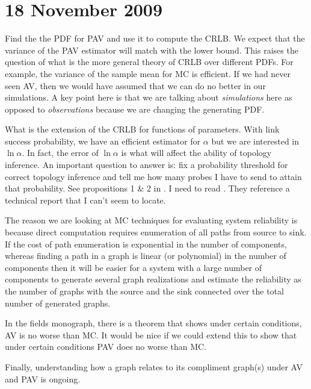 \section{18 November 2009}
Find the the \ac{PDF} for \ac{PAV} and use it to compute the \ac{CRLB}. We expect that the variance of the \ac{PAV} estimator will match with the lower bound. This raises the question of what is the more general theory of \ac{CRLB} over different \ac{PDF}s. For example, the variance of the sample mean for \ac{MC} is efficient. If we had never seen \ac{AV}, then we would have assumed that we can do no better in our simulations. A key point here is that we are talking about \emph{simulations} here as opposed to \emph{observations} because we are changing the generating \ac{PDF}.

What is the extension of the \ac{CRLB} for functions of parameters. With link success probability, we have an efficient estimator for $\alpha$ but we are interested in $\ln\alpha$. In fact, the error of $\ln\alpha$ is what will affect the ability of topology inference. An important question to answer is: fix a probability threshold for correct topology inference and tell me how many probes I have to send to attain that probability. See propositions 1 \& 2 in \cite{ni-2008b}. I need to read \cite{ni-2008a}. They reference a technical report that I can't seem to locate.

The reason we are looking at \ac{MC} techniques for evaluating system reliability is because direct computation requires enumeration of all paths from source to sink. If the cost of path enumeration is exponential in the number of components, whereas finding a path in a graph is linear (or polynomial) in the number of components then it will be easier for a system with a large number of components to generate several graph realizations and estimate the reliability as the number of graphs with the source and the sink connected over the total number of generated graphs.

In the fields monograph, there is a theorem that shows under certain conditions, \ac{AV} is no worse than \ac{MC}. It would be nice if we could extend this to show that under certain conditions \ac{PAV} does no worse than \ac{MC}.

Finally, understanding how a graph relates to its compliment graph(s) under \ac{AV} and \ac{PAV} is ongoing.